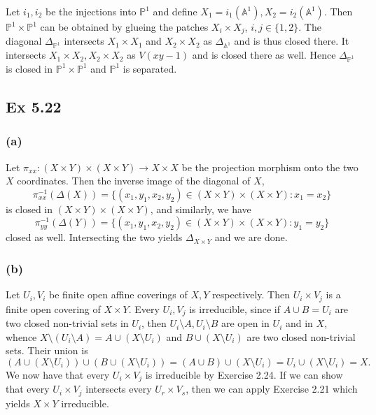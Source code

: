 \documentclass{article}
\theoremstyle{definition}
\renewcommand{\P}{\mathbb{P}}
\newcommand{\A}{\mathbb{A}}
\renewcommand{\AA}[1]{\A^{#1}}
\newcommand{\PP}[1]{\P^{#1}}
\begin{document}
Let $i_1, i_2$ be the injections into $\PP{1}$ and define $X_1 = i_1(\AA{1}),
X_2 = i_2(\AA{1})$. Then $\PP{1} \times \PP{1}$ can be obtained by glueing
the patches $X_i \times X_j$, $i, j \in \{1, 2\}$. The diagonal $\Delta_{\PP{1}}$
intersects $X_1 \times X_1$ and $X_2 \times X_2$ as $\Delta_{\AA{1}}$ and is
thus closed there. It intersects $X_1 \times X_2, X_2 \times X_2$ as $V(xy -
1)$ and is closed there as well. Hence $\Delta_{\PP{1}}$ is closed in
$\PP{1} \times \PP{1}$ and $\PP{1}$ is separated.

\subsection*{Ex 5.22} 

\subsubsection*{(a)} 

Let $\pi_{xx} : (X \times Y) \times (X \times Y) \to X \times X$ be the
projection morphism onto the two $X$ coordinates. Then the inverse image of the
diagonal of $X$,
\[
	\pi_{xx}^{-1}(\Delta(X))
	=
	\{(x_1, y_1, x_2, y_2) \in (X \times Y) \times (X \times Y) : x_1 = x_2\}
\]
is closed in $(X \times Y) \times (X \times Y)$, and similarly, we have  
\[
	\pi_{yy}^{-1}(\Delta(Y))
	=
	\{(x_1, y_1, x_2, y_2) \in (X \times Y) \times (X \times Y) : y_1 = y_2\}
\]
closed as well. Intersecting the two yields $\Delta_{X \times Y}$ and we are
done.

\subsubsection*{(b)} 

Let $U_i, V_i$ be finite open affine coverings of $X, Y$ respectively. Then
$U_i \times V_j$ is a finite open covering of $X \times Y$. Every $U_i, V_j$ is
irreducible, since if $A \cup B = U_i$ are two closed non-trivial sets in
$U_i$, then $U_i \setminus A, U_i \setminus B$ are open in $U_i$ and in $X$,
whence $X \setminus (U_i \setminus A) = A \cup (X \setminus U_i)$ and $B \cup
(X \setminus U_i)$ are two closed non-trivial sets. Their union is 
\[
	(A \cup (X \setminus U_i))
	\cup
	(B \cup (X \setminus U_i))
	=
	(A \cup B)
	\cup
	(X \setminus U_i)
	=
	U_i
	\cup
	(X \setminus U_i)
	=
	X.
\] 
We now have that  every $U_i \times V_j$ is irreducible by Exercise 2.24. If we
can show that every $U_i \times V_j$ intersects every $U_r \times V_s$, then we
can apply Exercise 2.21 which yields $X \times Y$ irreducible. \\
\end{document}
